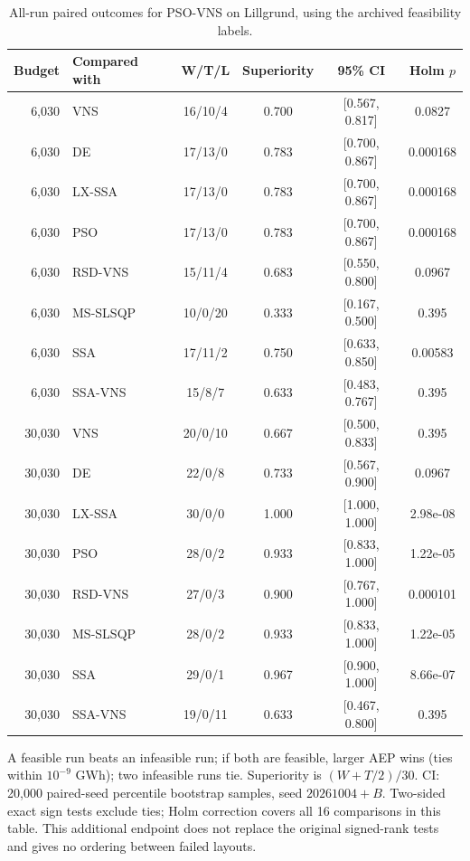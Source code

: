 \begin{table}[!htbp]
\centering
\caption{All-run paired outcomes for PSO-VNS on Lillgrund, using the archived feasibility labels.}
\label{tab:archive-paired}
\small\setlength{\tabcolsep}{4pt}
\begin{tabular}{rlcccc}
\toprule
Budget & Compared with & W/T/L & Superiority & 95\% CI & Holm $p$ \\
\midrule
6,030 & VNS & 16/10/4 & 0.700 & [0.567, 0.817] & 0.0827 \\
6,030 & DE & 17/13/0 & 0.783 & [0.700, 0.867] & 0.000168 \\
6,030 & LX-SSA & 17/13/0 & 0.783 & [0.700, 0.867] & 0.000168 \\
6,030 & PSO & 17/13/0 & 0.783 & [0.700, 0.867] & 0.000168 \\
6,030 & RSD-VNS & 15/11/4 & 0.683 & [0.550, 0.800] & 0.0967 \\
6,030 & MS-SLSQP & 10/0/20 & 0.333 & [0.167, 0.500] & 0.395 \\
6,030 & SSA & 17/11/2 & 0.750 & [0.633, 0.850] & 0.00583 \\
6,030 & SSA-VNS & 15/8/7 & 0.633 & [0.483, 0.767] & 0.395 \\
30,030 & VNS & 20/0/10 & 0.667 & [0.500, 0.833] & 0.395 \\
30,030 & DE & 22/0/8 & 0.733 & [0.567, 0.900] & 0.0967 \\
30,030 & LX-SSA & 30/0/0 & 1.000 & [1.000, 1.000] & 2.98e-08 \\
30,030 & PSO & 28/0/2 & 0.933 & [0.833, 1.000] & 1.22e-05 \\
30,030 & RSD-VNS & 27/0/3 & 0.900 & [0.767, 1.000] & 0.000101 \\
30,030 & MS-SLSQP & 28/0/2 & 0.933 & [0.833, 1.000] & 1.22e-05 \\
30,030 & SSA & 29/0/1 & 0.967 & [0.900, 1.000] & 8.66e-07 \\
30,030 & SSA-VNS & 19/0/11 & 0.633 & [0.467, 0.800] & 0.395 \\
\bottomrule
\end{tabular}
\par\smallskip\parbox{\textwidth}{\footnotesize A feasible run beats an infeasible run; if both are feasible, larger AEP wins (ties within $10^{-9}$ GWh); two infeasible runs tie. Superiority is $(W+T/2)/30$. CI: 20,000 paired-seed percentile bootstrap samples, seed $20261004+B$. Two-sided exact sign tests exclude ties; Holm correction covers all 16 comparisons in this table. This additional endpoint does not replace the original signed-rank tests and gives no ordering between failed layouts.}
\end{table}
